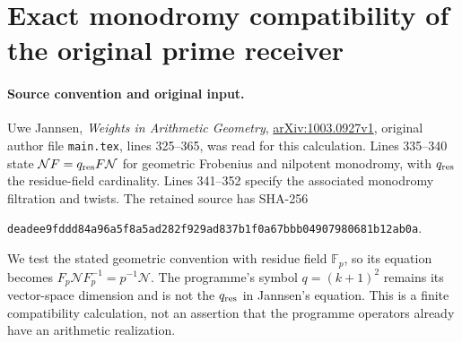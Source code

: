 \section{Exact monodromy compatibility of the original prime receiver}
\label{sec:monodromy-receiver-review}

\paragraph{Source convention and original input.}
Uwe Jannsen, \emph{Weights in Arithmetic Geometry},
\href{https://arxiv.org/abs/1003.0927v1}{arXiv:1003.0927v1},
original author file \nolinkurl{main.tex}, lines 325--365, was read
for this calculation. Lines 335--340 state
$\mathcal N F=q_{\rm res}F\mathcal N$ for geometric Frobenius
and nilpotent monodromy, with $q_{\rm res}$ the residue-field
cardinality. Lines 341--352 specify the associated monodromy
filtration and twists. The retained source has SHA-256
\par\noindent
\nolinkurl{deadee9fddd84a96a5f8a5ad282f929ad837b1f0a67bbb04907980681b12ab0a}.
\par\noindent
We test the stated geometric convention with residue field
$\mathbb F_p$, so its equation becomes
$F_p\mathcal N F_p^{-1}=p^{-1}\mathcal N$.
The programme's symbol $q=(k+1)^2$ remains its vector-space
dimension and is not the $q_{\rm res}$ in Jannsen's equation.
This is a finite compatibility calculation, not an assertion
that the programme operators already have an arithmetic realization.

